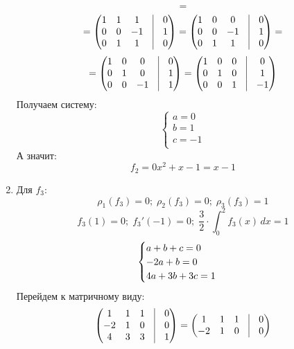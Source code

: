 \documentclass[a4paper,12pt]{article}
\begin{document}
\begin{enumerate}
\[=
\]
\[
=
\begin{pmatrix}
1 & 1 & 1 & \vrule &0  \\
0 & 0 & -1 & \vrule &1  \\
0 & 1 & 1 & \vrule &0 \\
\end{pmatrix}
=
\begin{pmatrix}
1 & 0 & 0 & \vrule &0  \\
0 & 0 & -1 & \vrule &1 \\
0 & 1 & 1 & \vrule &0  \\
\end{pmatrix}
=
\]
\[
=
\begin{pmatrix}
1 & 0 & 0 & \vrule &0 \\
0 & 1 & 0 & \vrule &1 \\
0 & 0 & -1 & \vrule &1 \\
\end{pmatrix}
=
\begin{pmatrix}
1 & 0 & 0 & \vrule &0\\
0 & 1 & 0 & \vrule &1\\
0 & 0 & 1 & \vrule &-1\\
\end{pmatrix}
\]
Получаем систему:
\[
\begin{cases}
a = 0\\
b = 1 \\
c = -1\\
\end{cases}
\]
А значит:
\[
f_2 = 0x^2 + x  - 1 = x - 1
\]
\item Для $f_3$:
\[
\rho_1(f_3) = 0; \; \rho_2(f_3) = 0; \; \rho_3(f_3) = 1
\]
\[
f_3(1)  = 0; \; f_3'(-1) = 0; \; \frac{3}{2} \cdot \int_{0}^{2} f_3(x) \, dx = 1
\]
\[
\begin{cases}
a + b + c = 0 \\
-2a + b = 0 \\
4a +3b + 3c = 1\\
\end{cases}\\
\]
Перейдем к матричному виду:
\[
\begin{pmatrix}
1 & 1 & 1 & \vrule &0 \\
-2 & 1 & 0 & \vrule &0  \\
4 & 3 & 3 & \vrule &1 \\
\end{pmatrix}
=
\begin{pmatrix}
1 & 1 & 1 & \vrule &0  \\
-2 & 1 & 0 & \vrule &0  \\

\end{pmatrix}\]
\end{enumerate}
\end{document}
